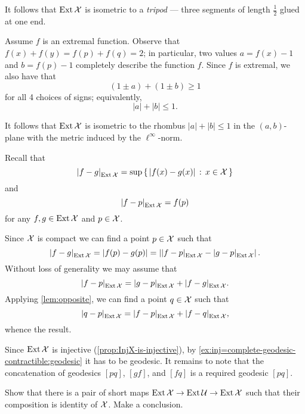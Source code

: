 It follows that $\mathop{\rm Ext}\nolimits\mathcal{X}$ is isometric to a {}\emph{tripod} --- three segments of length $\tfrac12$ glued at one end.

Assume $f$ is an extremal function.
Observe that 
$f(x)+f(y)=f(p)+f(q)=2$;
in particular, two values $a=f(x)-1$ and $b=f(p)-1$ completely describe the function $f$.
Since $f$ is extremal, we also have that 
\[(1\pm a)+(1\pm b)\ge 1\]
for all 4 choices of signs;
equivalently, 
\[|a|+|b|\le 1.\]

It follows that $\mathop{\rm Ext}\nolimits\mathcal{X}$ is isometric to the rhombus $|a|+|b|\le 1$ in the $(a,b)$-plane with the metric induced by the $\ell^\infty$-norm.





Recall that 
\[\dist{f}{g}{\Inj\spc{X}}=\sup\set{|f(x)-g(x)|}{x\in\spc{X}}\]
and 
\[\dist{f}{p}{\Inj\spc{X}}=f(p)\]
for any $f,g\in \mathop{\rm Ext}\nolimits\mathcal{X}$ and $p\in \mathcal{X}$.

Since $\mathcal{X}$ is compact we can find a point $p\in\mathcal{X}$ such that 
\[\dist{f}{g}{\Inj\spc{X}}=|f(p)-g(p)|=\left|\dist{f}{p}{\Inj\spc{X}}-\dist{g}{p}{\Inj\spc{X}}\right|.\]
Without loss of generality we may assume that 
\[\dist{f}{p}{\Inj\spc{X}}
=
\dist{g}{p}{\Inj\spc{X}}
+
\dist{f}{g}{\Inj\spc{X}}.\]
Applying \ref{lem:opposite}, we can find a point $q\in\mathcal{X}$ such that 
\[\dist{q}{p}{\Inj\spc{X}}
=
\dist{f}{p}{\Inj\spc{X}}
+
\dist{f}{q}{\Inj\spc{X}},\]
whence the result.

Since $\mathop{\rm Ext}\nolimits\mathcal{X}$ is injective (\ref{prop:InjX-is-injective}), by \ref{ex:inj=complete-geodesic-contractible:geodesic} it has to be geodesic. It remains to note that the concatenation of geodesics $[pq]$, $[gf]$, and $[fq]$ is a required geodesic $[pq]$.

Show that there is a pair of short maps 
$\mathop{\rm Ext}\nolimits\mathcal{X}\to\mathop{\rm Ext}\nolimits\mathcal{U}\to\mathop{\rm Ext}\nolimits\mathcal{X}$ 
such that their composition is identity of $\mathcal{X}$.
Make a conclusion.


